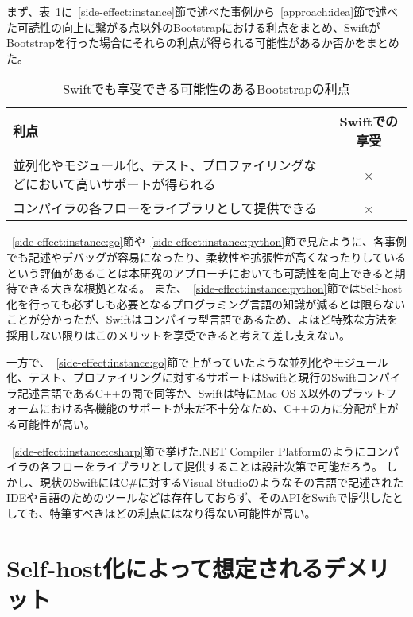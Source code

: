 まず、表~\ref{table:bootstrap-merit}に~\ref{side-effect:instance}節で述べた事例から~\ref{approach:idea}節で述べた可読性の向上に繋がる点以外のBootstrapにおける利点をまとめ、SwiftがBootstrapを行った場合にそれらの利点が得られる可能性があるか否かをまとめた。

\begin{table}[hb]
    \begin{center}
        \caption{Swiftでも享受できる可能性のあるBootstrapの利点}
        \begin{tabular}{|m{10cm}|c|}
            \hline
            利点 & Swiftでの享受 \\
            \hline
            並列化やモジュール化、テスト、プロファイリングなどにおいて高いサポートが得られる & × \\
            \hline
            コンパイラの各フローをライブラリとして提供できる & × \\
            \hline
        \end{tabular}
        \label{table:bootstrap-merit}
    \end{center}
\end{table}


~\ref{side-effect:instance:go}節や~\ref{side-effect:instance:python}節で見たように、各事例でも記述やデバッグが容易になったり、柔軟性や拡張性が高くなったりしているという評価があることは本研究のアプローチにおいても可読性を向上できると期待できる大きな根拠となる。
また、~\ref{side-effect:instance:python}節ではSelf-host化を行っても必ずしも必要となるプログラミング言語の知識が減るとは限らないことが分かったが、Swiftはコンパイラ型言語であるため、よほど特殊な方法を採用しない限りはこのメリットを享受できると考えて差し支えない。

一方で、~\ref{side-effect:instance:go}節で上がっていたような並列化やモジュール化、テスト、プロファイリングに対するサポートはSwiftと現行のSwiftコンパイラ記述言語であるC++の間で同等か、Swiftは特にMac OS X以外のプラットフォームにおける各機能のサポートが未だ不十分なため、C++の方に分配が上がる可能性が高い。

~\ref{side-effect:instance:csharp}節で挙げた.NET Compiler Platformのようにコンパイラの各フローをライブラリとして提供することは設計次第で可能だろう。
しかし、現状のSwiftにはC\#に対するVisual Studioのようなその言語で記述されたIDEや言語のためのツールなどは存在しておらず、そのAPIをSwiftで提供したとしても、特筆すべきほどの利点にはなり得ない可能性が高い。

\section{Self-host化によって想定されるデメリット}
\label{side-effect:swift:demerit}

